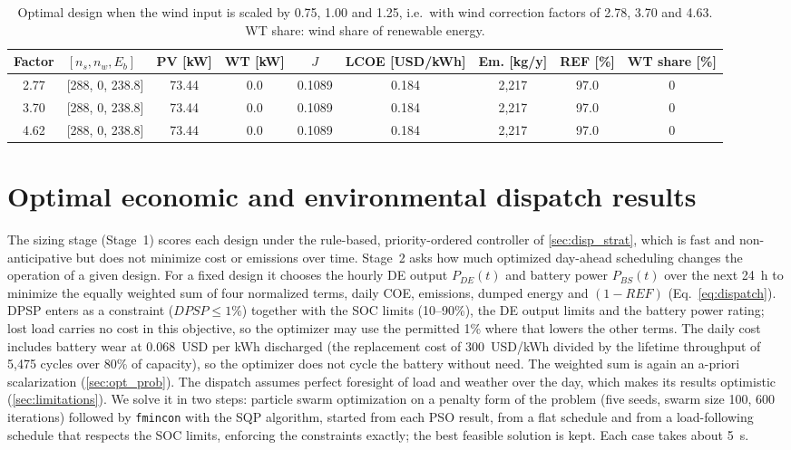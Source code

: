 \documentclass[final,3p,times]{elsarticle}
\begin{document}
\begin{table}[htbp]
\centering
\scriptsize
\setlength{\tabcolsep}{4pt}
\begin{tabular}{c l c c c c c c c}
\toprule
\textbf{Factor} & \textbf{$[n_s, n_w, E_b]$} & \textbf{PV [kW]} & \textbf{WT [kW]} & \textbf{$J$} & \textbf{LCOE [USD/kWh]} & \textbf{Em. [kg/y]} & \textbf{REF [\%]} & \textbf{WT share [\%]} \\
\midrule
2.77 & [288, 0, 238.8] & 73.44 & 0.0 & 0.1089 & 0.184 & 2,217 & 97.0 & 0 \\
3.70 & [288, 0, 238.8] & 73.44 & 0.0 & 0.1089 & 0.184 & 2,217 & 97.0 & 0 \\
4.62 & [288, 0, 238.8] & 73.44 & 0.0 & 0.1089 & 0.184 & 2,217 & 97.0 & 0 \\
\bottomrule
\end{tabular}
\caption{\label{tab:wind_sweep} Optimal design when the wind input is scaled by 0.75, 1.00 and 1.25, i.e.\ with wind correction factors of 2.78, 3.70 and 4.63. WT share: wind share of renewable energy.}
\end{table}

\section{\label{sec:dispatch_opt} Optimal economic and environmental dispatch results}

The sizing stage (Stage~1) scores each design under the rule-based, priority-ordered controller of \cref{sec:disp_strat}, which is fast and non-anticipative but does not minimize cost or emissions over time. Stage~2 asks how much optimized day-ahead scheduling changes the operation of a given design. For a fixed design it chooses the hourly DE output $P_{DE}(t)$ and battery power $P_{BS}(t)$ over the next 24~h to minimize the equally weighted sum of four normalized terms, daily COE, emissions, dumped energy and $(1-REF)$ (Eq.~\ref{eq:dispatch}). DPSP enters as a constraint ($DPSP \leq 1\%$) together with the SOC limits (10--90\%), the DE output limits and the battery power rating; lost load carries no cost in this objective, so the optimizer may use the permitted 1\% where that lowers the other terms. The daily cost includes battery wear at 0.068~USD per kWh discharged (the replacement cost of 300~USD/kWh divided by the lifetime throughput of 5,475 cycles over 80\% of capacity), so the optimizer does not cycle the battery without need. The weighted sum is again an a-priori scalarization (\cref{sec:opt_prob}). The dispatch assumes perfect foresight of load and weather over the day, which makes its results optimistic (\cref{sec:limitations}). We solve it in two steps: particle swarm optimization on a penalty form of the problem (five seeds, swarm size 100, 600 iterations) followed by \texttt{fmincon} with the SQP algorithm, started from each PSO result, from a flat schedule and from a load-following schedule that respects the SOC limits, enforcing the constraints exactly; the best feasible solution is kept. Each case takes about 5~s.
\end{document}
